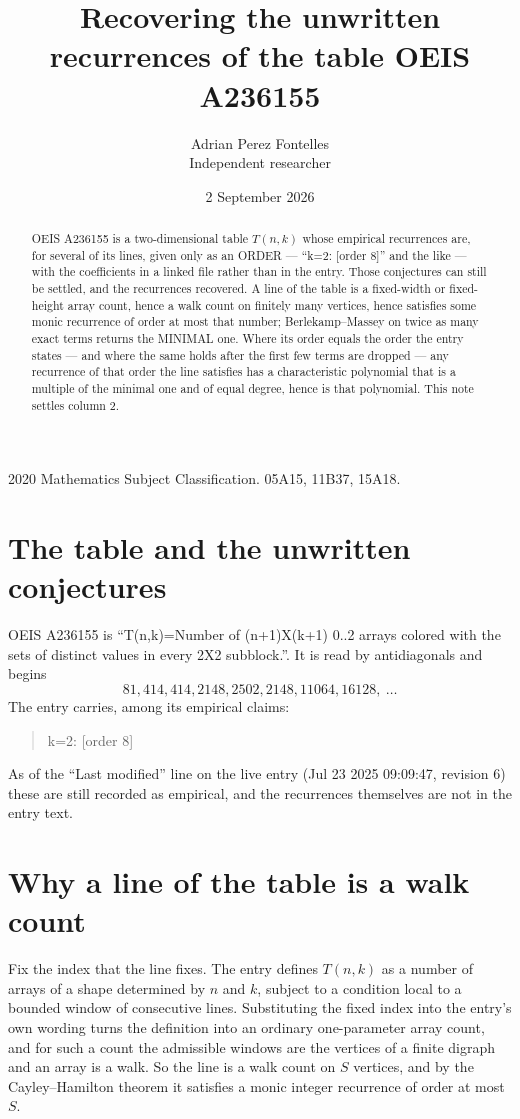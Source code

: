 \documentclass[11pt,a4paper]{article}
\title{Recovering the unwritten recurrences of the table OEIS A236155}
\author{Adrian Perez Fontelles\\ \small Independent researcher}
\date{2 September 2026}
\theoremstyle{plain}
\theoremstyle{definition}
\begin{document}
\maketitle

\begin{abstract}
OEIS A236155 is a two-dimensional table $T(n,k)$ whose empirical recurrences are, for several of
its lines, given only as an ORDER --- ``k=2: [order 8]'' and the like --- with the
coefficients in a linked file rather than in the entry. Those conjectures can still be settled,
and the recurrences recovered. A line of the table is a fixed-width or fixed-height array
count, hence a walk count on finitely many vertices, hence satisfies some monic recurrence of
order at most that number; Berlekamp--Massey on twice as many exact terms returns the MINIMAL
one. Where its order equals the order the entry states --- and where the same holds after the
first few terms are dropped --- any recurrence of that order the line satisfies has a
characteristic polynomial that is a multiple of the minimal one and of equal degree, hence is
that polynomial. This note settles column 2.
\end{abstract}

\noindent\small 2020 Mathematics Subject Classification. 05A15, 11B37, 15A18.\normalsize

\section{The table and the unwritten conjectures}

OEIS A236155 is ``T(n,k)=Number of (n+1)X(k+1) 0..2 arrays colored with the sets of distinct values in every 2X2 subblock.''. It is read by antidiagonals and begins
\[
81, 414, 414, 2148, 2502, 2148, 11064, 16128,\ \dots
\]
The entry carries, among its empirical claims:
\begin{quote}\small
k=2: [order 8]
\end{quote}
As of the ``Last modified'' line on the live entry (Jul 23 2025 09:09:47, revision 6) these are still
recorded as empirical, and the recurrences themselves are not in the entry text.

\section{Why a line of the table is a walk count}

Fix the index that the line fixes. The entry defines $T(n,k)$ as a number of arrays of a shape
determined by $n$ and $k$, subject to a condition local to a bounded window of consecutive
lines. Substituting the fixed index into the entry's own wording turns the definition into an
ordinary one-parameter array count, and for such a count the admissible windows are the
vertices of a finite digraph and an array is a walk. So the line is a walk count on $S$
vertices, and by the Cayley--Hamilton theorem it satisfies a monic integer recurrence of order
at most $S$.
\end{document}
